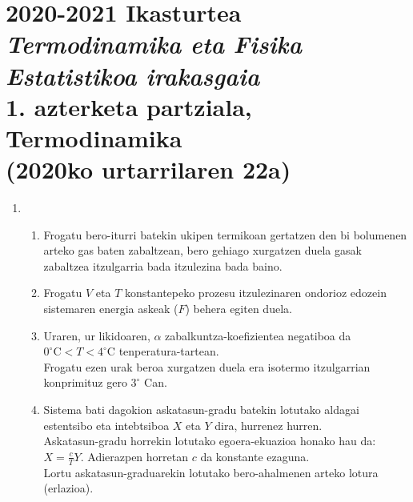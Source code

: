 \documentclass[10pt]{article}              %
\begin{document}




\section*{2020-2021 Ikasturtea\\
\textit{Termodinamika eta Fisika Estatistikoa irakasgaia}\\
1. azterketa partziala, Termodinamika\\
(2020ko urtarrilaren 22a)}

\vspace{1.25cm}


\begin{enumerate}



\item 
	\begin{enumerate}
	\item Frogatu bero-iturri batekin ukipen termikoan gertatzen den bi bolumenen arteko gas baten zabaltzean, bero gehiago xurgatzen duela gasak zabaltzea itzulgarria bada itzulezina bada baino.
	\item Frogatu $V$ eta $T$ konstantepeko prozesu itzulezinaren ondorioz edozein sistemaren energia askeak ($F$) behera egiten duela.
	\item Uraren, ur likidoaren, $\alpha$ zabalkuntza-koefizientea negatiboa da $0^{\circ} \textrm{C}< T < 4^{\circ} \textrm{C}$ tenperatura-tartean.\\ 
	Frogatu ezen urak beroa xurgatzen duela era isotermo itzulgarrian konprimituz gero $3^{\circ}$ Can.
	\item Sistema bati dagokion askatasun-gradu batekin lotutako aldagai estentsibo eta intebtsiboa $X$ eta $Y$ dira, hurrenez hurren.\\
	Askatasun-gradu horrekin lotutako egoera-ekuazioa honako hau da: $ X = \frac{c}{T} Y $. Adierazpen horretan $c$ da konstante ezaguna.\\
	Lortu askatasun-graduarekin lotutako bero-ahalmenen arteko lotura (erlazioa).
	\end{enumerate}
	

\end{enumerate}
\end{document}
